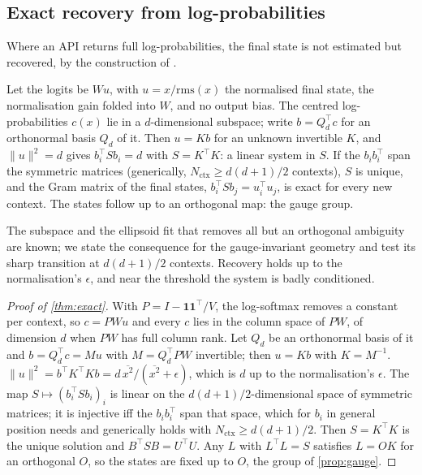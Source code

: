 \subsection{Exact recovery from log-probabilities}
\label{app:exact}
Where an API returns full log-probabilities, the final state is not estimated but recovered, by the construction of \citet[App.~H]{carlini2024stealing}.
\begin{theorem}\label{thm:exact}
Let the logits be $Wu$, with $u=x/\mathrm{rms}(x)$ the normalised final state, the normalisation gain folded into $W$, and no output bias. The centred log-probabilities $c(x)$ lie in a $d$-dimensional subspace; write $b=Q_d^{\top}c$ for an orthonormal basis $Q_d$ of it. Then $u=Kb$ for an unknown invertible $K$, and $\|u\|^2=d$ gives $b_i^{\top}Sb_i=d$ with $S=K^{\top}K$: a linear system in $S$. If the $b_ib_i^{\top}$ span the symmetric matrices (generically, $N_{\mathrm{ctx}}\ge d(d+1)/2$ contexts), $S$ is unique, and the Gram matrix of the final states, $b_i^{\top}Sb_j=u_i^{\top}u_j$, is exact for every new context. The states follow up to an orthogonal map: the gauge group.
\end{theorem}
The subspace \citep{finlayson2024logits} and the ellipsoid fit that removes all but an orthogonal ambiguity \citep[App.~H]{carlini2024stealing} are known; we state the consequence for the gauge-invariant geometry and test its sharp transition at $d(d+1)/2$ contexts. Recovery holds up to the normalisation's $\epsilon$, and near the threshold the system is badly conditioned.
\begin{proof}[Proof of \cref{thm:exact}]
With $P=I-\mathbf{1}\mathbf{1}^{\top}/V$, the log-softmax removes a constant per context, so $c=PWu$ and every $c$ lies in the column space of $PW$, of dimension $d$ when $PW$ has full column rank. Let $Q_d$ be an orthonormal basis of it and $b=Q_d^{\top}c=Mu$ with $M=Q_d^{\top}PW$ invertible; then $u=Kb$ with $K=M^{-1}$. $\|u\|^2=b^{\top}K^{\top}Kb=d\,\overline{x^2}/(\overline{x^2}+\epsilon)$, which is $d$ up to the normalisation's $\epsilon$. The map $S\mapsto(b_i^{\top}Sb_i)_i$ is linear on the $d(d+1)/2$-dimensional space of symmetric matrices; it is injective iff the $b_ib_i^{\top}$ span that space, which for $b_i$ in general position needs and generically holds with $N_{\mathrm{ctx}}\ge d(d+1)/2$. Then $S=K^{\top}K$ is the unique solution and $B^{\top}SB=U^{\top}U$. Any $L$ with $L^{\top}L=S$ satisfies $L=OK$ for an orthogonal $O$, so the states are fixed up to $O$, the group of \cref{prop:gauge}.
\end{proof}

